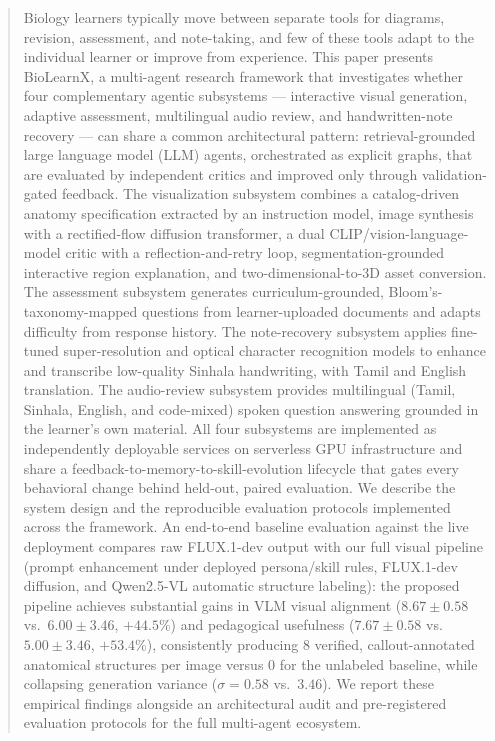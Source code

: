 \documentclass[conference]{IEEEtran}
\begin{document}
\begin{abstract}
Biology learners typically move between separate tools for diagrams, revision, assessment, and note-taking, and few of these tools adapt to the individual learner or improve from experience. This paper presents BioLearnX, a multi-agent research framework that investigates whether four complementary agentic subsystems --- interactive visual generation, adaptive assessment, multilingual audio review, and handwritten-note recovery --- can share a common architectural pattern: retrieval-grounded large language model (LLM) agents, orchestrated as explicit graphs, that are evaluated by independent critics and improved only through validation-gated feedback. The visualization subsystem combines a catalog-driven anatomy specification extracted by an instruction model, image synthesis with a rectified-flow diffusion transformer, a dual CLIP/vision-language-model critic with a reflection-and-retry loop, segmentation-grounded interactive region explanation, and two-dimensional-to-3D asset conversion. The assessment subsystem generates curriculum-grounded, Bloom's-taxonomy-mapped questions from learner-uploaded documents and adapts difficulty from response history. The note-recovery subsystem applies fine-tuned super-resolution and optical character recognition models to enhance and transcribe low-quality Sinhala handwriting, with Tamil and English translation. The audio-review subsystem provides multilingual (Tamil, Sinhala, English, and code-mixed) spoken question answering grounded in the learner's own material. All four subsystems are implemented as independently deployable services on serverless GPU infrastructure and share a feedback-to-memory-to-skill-evolution lifecycle that gates every behavioral change behind held-out, paired evaluation. We describe the system design and the reproducible evaluation protocols implemented across the framework. An end-to-end baseline evaluation against the live deployment compares raw FLUX.1-dev output with our full visual pipeline (prompt enhancement under deployed persona/skill rules, FLUX.1-dev diffusion, and Qwen2.5-VL automatic structure labeling): the proposed pipeline achieves substantial gains in VLM visual alignment ($8.67 \pm 0.58$ vs.\ $6.00 \pm 3.46$, $+44.5\%$) and pedagogical usefulness ($7.67 \pm 0.58$ vs.\ $5.00 \pm 3.46$, $+53.4\%$), consistently producing 8 verified, callout-annotated anatomical structures per image versus 0 for the unlabeled baseline, while collapsing generation variance ($\sigma=0.58$ vs.\ $3.46$). We report these empirical findings alongside an architectural audit and pre-registered evaluation protocols for the full multi-agent ecosystem.
\end{abstract}
\end{document}
